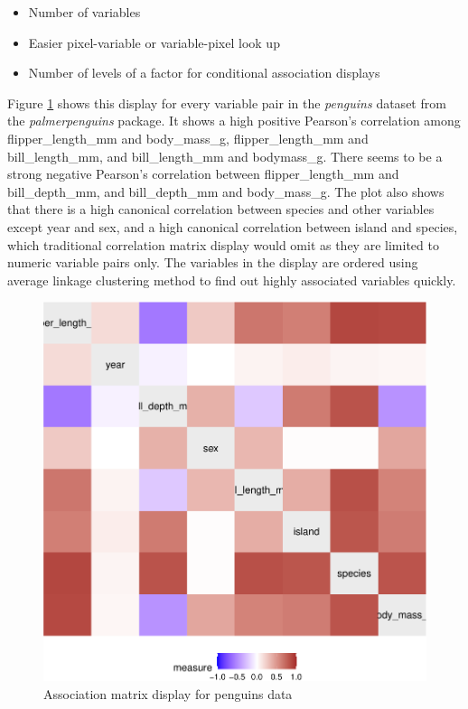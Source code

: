 \begin{itemize}
\item Number of variables
\item Easier pixel-variable or variable-pixel
look up
\item Number of levels of a factor for conditional association displays
\end{itemize}

Figure \ref{fig:assoc-heatmap} shows this display for every variable
pair in the \emph{penguins} dataset from the \emph{palmerpenguins}
package. It shows a high positive Pearson's correlation among
flipper\_length\_mm and body\_mass\_g, flipper\_length\_mm and
bill\_length\_mm, and bill\_length\_mm and bodymass\_g. There seems to
be a strong negative Pearson's correlation between flipper\_length\_mm
and bill\_depth\_mm, and bill\_depth\_mm and body\_mass\_g. The plot
also shows that there is a high canonical correlation between species
and other variables except year and sex, and a high canonical
correlation between island and species, which traditional correlation
matrix display would omit as they are limited to numeric variable pairs
only. The variables in the display are ordered using average linkage
clustering method to find out highly associated variables quickly.

\begin{Schunk}
\begin{figure}

{\centering \includegraphics{rj_paper_files/figure-latex/assoc-heatmap-1} 

}

\caption[Association matrix display for penguins data]{Association matrix display for penguins data}\label{fig:assoc-heatmap}
\end{figure}
\end{Schunk}

